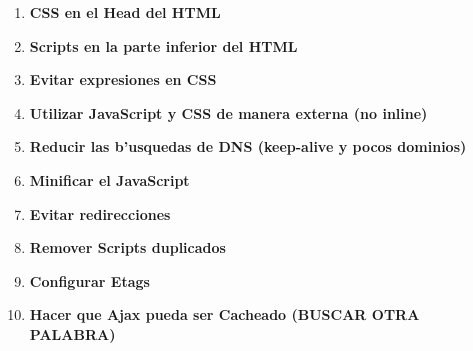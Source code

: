 \begin{enumerate}
Los tipos de archivos que se deber'ian comprimir son aquellos de texto, tales como HTML, Scripts, CSS, etc. Aquellos formatos que ya se encuentran comprimidos como las im'agenes o los archivos PDF no deber'ian comprimirse ya que se desperdicia tiempo de CPU del servidor\footnote{Para realizar la compresi'on.} y adem'as puede incluso incrementar el tama'no del archivo.

\item \textbf{CSS en el Head del HTML}
\item \textbf{Scripts en la parte inferior del HTML}
\item \textbf{Evitar expresiones en CSS}
\item \textbf{Utilizar JavaScript y CSS de manera externa (no inline)}
\item \textbf{Reducir las b'usquedas de DNS (keep-alive y pocos dominios)}
\item \textbf{Minificar el JavaScript}
\item \textbf{Evitar redirecciones}
\item \textbf{Remover Scripts duplicados}
\item \textbf{Configurar Etags}
\item \textbf{Hacer que Ajax pueda ser Cacheado (BUSCAR OTRA PALABRA)}

\end{enumerate}